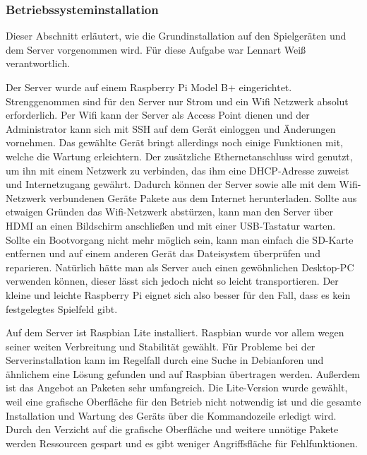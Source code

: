 \subsubsection{Betriebssysteminstallation}

Dieser Abschnitt erläutert, wie die Grundinstallation auf den Spielgeräten und dem Server
vorgenommen wird.
Für diese Aufgabe war Lennart Weiß verantwortlich.

Der Server wurde auf einem Raspberry Pi Model B+ eingerichtet. Strenggenommen
sind für den Server nur Strom und ein Wifi Netzwerk absolut erforderlich. Per
Wifi kann der Server als Access Point dienen und der Administrator kann sich mit
SSH auf dem Gerät einloggen und Änderungen vornehmen. Das gewählte Gerät bringt
allerdings noch einige Funktionen mit, welche die Wartung erleichtern. Der
zusätzliche Ethernetanschluss wird genutzt, um ihn mit einem Netzwerk zu
verbinden, das ihm eine DHCP-Adresse zuweist und Internetzugang gewährt. 
Dadurch können der Server sowie alle mit dem Wifi-Netzwerk verbundenen Geräte
Pakete aus dem Internet herunterladen. Sollte aus etwaigen Gründen das Wifi-Netzwerk
abstürzen, kann man den Server über HDMI an einen Bildschirm
anschließen und mit einer USB-Tastatur warten. Sollte ein Bootvorgang nicht
mehr möglich sein, kann man einfach die SD-Karte entfernen und auf einem anderen
Gerät das Dateisystem überprüfen und reparieren. Natürlich hätte man als Server
auch einen gewöhnlichen Desktop-PC verwenden können, dieser lässt sich jedoch
nicht so leicht transportieren. Der kleine und leichte Raspberry Pi eignet sich
also besser für den Fall, dass es kein festgelegtes Spielfeld gibt.

Auf dem Server ist Raspbian Lite installiert. Raspbian wurde vor allem wegen 
seiner weiten Verbreitung und Stabilität gewählt. Für Probleme bei der 
Serverinstallation kann im Regelfall durch eine Suche in Debianforen und ähnlichem
eine Lösung gefunden und auf Raspbian übertragen werden. Außerdem ist das
Angebot an Paketen sehr umfangreich. Die Lite-Version wurde gewählt, weil eine
grafische Oberfläche für den Betrieb nicht notwendig ist und die gesamte
Installation und Wartung des Geräts über die Kommandozeile erledigt wird.
Durch den Verzicht auf die grafische Oberfläche und weitere unnötige Pakete
werden Ressourcen gespart und es gibt weniger Angriffsfläche für Fehlfunktionen.

